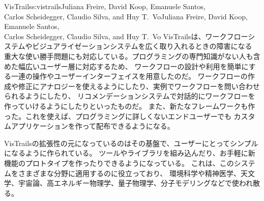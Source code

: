 \begin{aosachaptertoc}{VisTrails}{s:vistrails}{Juliana Freire, David Koop, Emanuele Santos, \\ Carlos Scheidegger, Claudio Silva, and Huy T.\ Vo}{Juliana Freire, David Koop, Emanuele Santos, \\ \hspace*{0.9cm} Carlos Scheidegger, Claudio Silva, and Huy T.\ Vo}
VisTrailsは、ワークフローシステムやビジュアライゼーションシステムを広く取り入れるときの障害になる
重大な使い勝手問題にも対応している。プログラミングの専門知識がない人も含めた幅広いユーザー層に対応するため、
ワークフローの設計や利用を簡単にする一連の操作やユーザーインターフェイスを用意したのだ\cite{bib:freire:vistrails}。
ワークフローの作成や修正にアナロジーを使えるようにしたり、実例でワークフローを問い合わせられるようにしたり、
リコメンデーションシステムで対話的にワークフローを作っていけるようにしたりといったものだ\cite{bib:scheidegger:analogy}。
また、新たなフレームワークも作った。これを使えば、プログラミングに詳しくないエンドユーザーでも
カスタムアプリケーションを作って配布できるようになる。

VisTrailsの拡張性の元になっているのはその基盤で、ユーザーにとってシンプルになるように作られている。
ツールやライブラリを組み込んだり、お手軽に新機能のプロトタイプを作ったりできるようになっている。
これは、このシステムをさまざまな分野に適用するのに役立っており、
環境科学や精神医学、天文学、宇宙論、高エネルギー物理学、量子物理学、分子モデリングなどで使われ散る。


\end{aosachaptertoc}
